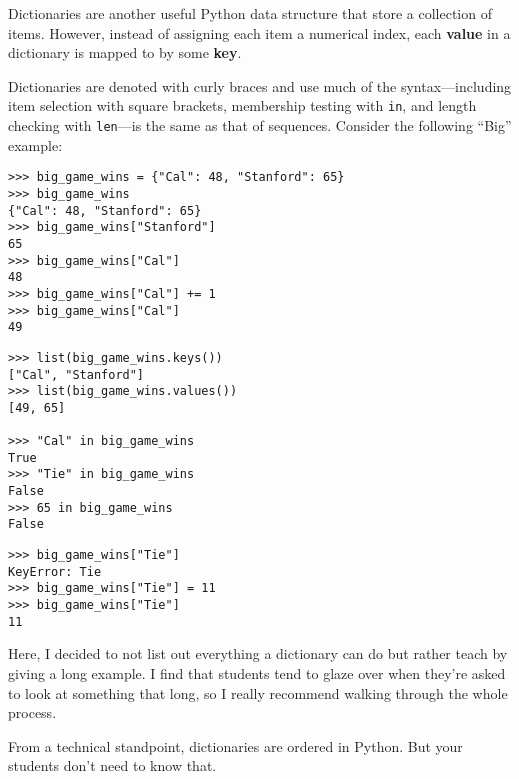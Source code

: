 \begin{blocksection}
Dictionaries are another useful Python data structure that store a collection of items. However, instead of assigning each item a numerical index, each \textbf{value} in a dictionary is mapped to by some \textbf{key}. 

Dictionaries are denoted with curly braces and use much of the syntax---including item selection with square brackets, membership testing with \lstinline{in}, and length checking with \lstinline{len}---is the same as that of sequences. Consider the following ``Big'' example:
\begin{lstlisting}
>>> big_game_wins = {"Cal": 48, "Stanford": 65}
>>> big_game_wins 
{"Cal": 48, "Stanford": 65}
>>> big_game_wins["Stanford"]
65
>>> big_game_wins["Cal"]
48
>>> big_game_wins["Cal"] += 1
>>> big_game_wins["Cal"]
49
\end{lstlisting}
\end{blocksection}

\begin{blocksection}
\begin{lstlisting}
>>> list(big_game_wins.keys())
["Cal", "Stanford"]
>>> list(big_game_wins.values())
[49, 65]

>>> "Cal" in big_game_wins
True
>>> "Tie" in big_game_wins
False
>>> 65 in big_game_wins
False
\end{lstlisting}
\end{blocksection}

\begin{blocksection}
\begin{lstlisting}
>>> big_game_wins["Tie"]
KeyError: Tie
>>> big_game_wins["Tie"] = 11
>>> big_game_wins["Tie"]
11
\end{lstlisting}
\end{blocksection}

\begin{meta}
Here, I decided to not list out everything a dictionary can do but rather teach by giving a long example. I find that students tend to glaze over when they're asked to look at something that long, so I really recommend walking through the whole process. 

From a technical standpoint, dictionaries are ordered in Python. But your students don't need to know that.
\end{meta}